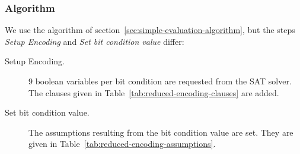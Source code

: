 \subsubsection{Algorithm}
\label{sec:reduced-encoding-algorithm}
%
We use the algorithm of section~\ref{sec:simple-evaluation-algorithm}, but the steps \emph{Setup Encoding} and \emph{Set bit condition value} differ:
%
\begin{description}
      \item[Setup Encoding.] $9$ boolean variables per bit condition are requested from the SAT solver. The clauses given in Table~\ref{tab:reduced-encoding-clauses} are added.
      \item[Set bit condition value.] The assumptions resulting from the bit condition value are set. They are given in Table~\ref{tab:reduced-encoding-assumptions}.
\end{description}

